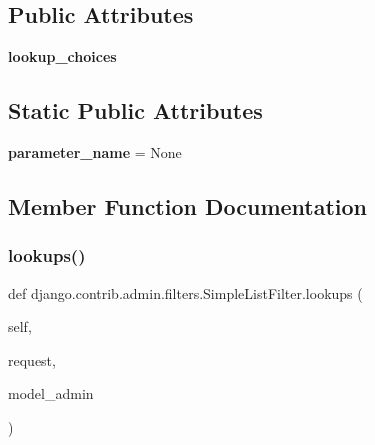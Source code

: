 \subsection*{Public Attributes}
\begin{DoxyCompactItemize}
\item 
\mbox{\label{classdjango_1_1contrib_1_1admin_1_1filters_1_1_simple_list_filter_a2c7be69d60d282bcc7d833b2ffdfc173}} 
{\bfseries lookup\+\_\+choices}
\end{DoxyCompactItemize}
\subsection*{Static Public Attributes}
\begin{DoxyCompactItemize}
\item 
\mbox{\label{classdjango_1_1contrib_1_1admin_1_1filters_1_1_simple_list_filter_ab3ce23e6b71c16fdd6632e46fac2668c}} 
{\bfseries parameter\+\_\+name} = None
\end{DoxyCompactItemize}


\subsection{Member Function Documentation}
\mbox{\label{classdjango_1_1contrib_1_1admin_1_1filters_1_1_simple_list_filter_ab26572954572952e450eafe9d3dfbfa6}} 
\subsubsection{\texorpdfstring{lookups()}{lookups()}}
{\footnotesize\ttfamily def django.\+contrib.\+admin.\+filters.\+Simple\+List\+Filter.\+lookups (\begin{DoxyParamCaption}\item[{}]{self,  }\item[{}]{request,  }\item[{}]{model\+\_\+admin }\end{DoxyParamCaption})}

